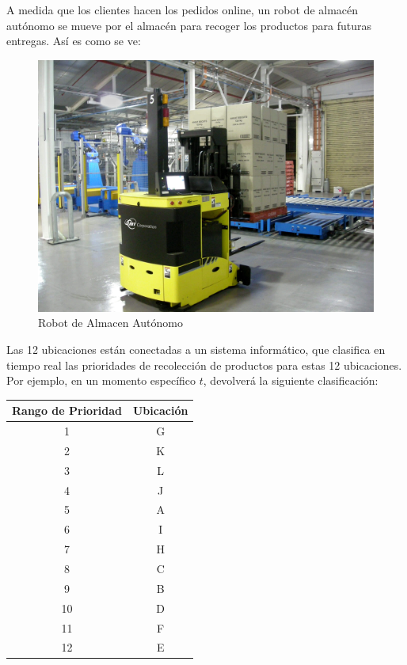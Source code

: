 \documentclass[
]{book}
\begin{document}
A medida que los clientes hacen los pedidos online, un robot de almacén autónomo se mueve por el almacén para recoger los productos para futuras entregas. Así es como se ve:

\begin{figure}
\centering
\includegraphics[width=1\textwidth,height=\textheight]{Images/Autonomous_Warehouse_Robot.jpg}
\caption{Robot de Almacen Autónomo}
\end{figure}

Las 12 ubicaciones están conectadas a un sistema informático, que clasifica en tiempo real las prioridades de recolección de productos para estas 12 ubicaciones. Por ejemplo, en un momento específico \(t\), devolverá la siguiente clasificación:

\begin{longtable}[]{@{}cc@{}}
\toprule()
\textbf{Rango de Prioridad} & \textbf{Ubicación} \\
\midrule()
\endhead
1 & G \\
2 & K \\
3 & L \\
4 & J \\
5 & A \\
6 & I \\
7 & H \\
8 & C \\
9 & B \\
10 & D \\
11 & F \\
12 & E \\
\bottomrule()
\end{longtable}
\end{document}
